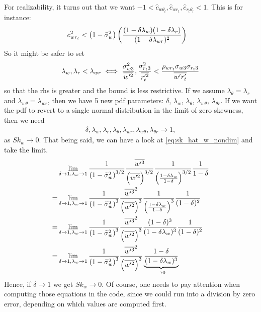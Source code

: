 For realizability, it turns out that we want
$-1 < \widehat{c}_{w \theta_l}, \widehat{c}_{w r_t}, \widehat{c}_{r_t \theta_l} < 1$.
This is for instance:
\begin{align}
    c_{w r_t}^2 &< \left( 1 - \tilde{\sigma}_w^2 \right) \left(
    \frac{(1-\delta \lambda_w)(1-\delta \lambda_r)}{(1-\delta \lambda_{w r})^2}
    \right)
\end{align}
So it might be safer to set
\begin{align}
    \label{eq:lambda_corr_ineq}
    \lambda_w , \lambda_r < \lambda_{w r}
    \iff
    \frac{\sigma_{w 3}^2}{\overline{w'^2}}, \frac{\sigma_{r_t 3}^2}{\overline{r_t'^2}} <
    \frac{\rho_{w r_t} \sigma_{w 3} \sigma_{r_t 3}}{\overline{w' r_t'}}
\end{align}
so that the \gls{rhs} is greater and the bound is less restrictive.
If we assume $\lambda_\theta = \lambda_r$ and $\lambda_{w\theta} = \lambda_{wr}$,
then we have 5 new \gls{pdf} parameters:
$\delta$, $\lambda_w$, $\lambda_\theta$, $\lambda_{w \theta}$, $\lambda_{\theta r}$.
If we want the \gls{pdf} to revert to a single normal distribution in the limit of zero skewness,
then we need
\begin{align}
    \delta, \lambda_w, \lambda_r, \lambda_\theta,
    \lambda_{w r}, \lambda_{w \theta}, \lambda_{\theta r}
    \to 1,
\end{align}
as $Sk_w \to 0$.
That being said, we can have a look at \cref{eq:sk_hat_w_nondim} and take the limit.
\begin{align}
    &\lim_{\delta \to 1, \lambda_w \to 1}
    \frac{1}{\left( 1 - \tilde{\sigma}_w^2 \right)^{3/2}}
    \frac{\overline{w'^3}}{\left(\overline{w'^2} \right)^{3/2}}
    \frac{1}{\left(\frac{1-\delta \lambda_w}{1-\delta}\right)^{3/2}}
    \frac{1}{1-\delta} \nonumber \\
    =&\lim_{\delta \to 1, \lambda_w \to 1}
    \frac{1}{\left( 1 - \tilde{\sigma}_w^2 \right)^3}
    \frac{\overline{w'^3}^2}{\left(\overline{w'^2} \right)^3}
    \frac{1}{\left(\frac{1-\delta \lambda_w}{1-\delta}\right)^3}
    \frac{1}{(1-\delta)^2} \nonumber \\
    =&\lim_{\delta \to 1, \lambda_w \to 1}
    \frac{1}{\left( 1 - \tilde{\sigma}_w^2 \right)^3}
    \frac{\overline{w'^3}^2}{\left(\overline{w'^2} \right)^3}
    \frac{(1-\delta)^3}{(1-\delta \lambda_w)^3}
    \frac{1}{(1-\delta)^2} \nonumber \\
    =&\lim_{\delta \to 1, \lambda_w \to 1}
    \frac{1}{\left( 1 - \tilde{\sigma}_w^2 \right)^3}
    \frac{\overline{w'^3}^2}{\left(\overline{w'^2} \right)^3}
    \underbrace{\frac{1-\delta}{(1-\delta \lambda_w)^3}}_{\to 0}
\end{align}
Hence, if $\delta \to 1$ we get $Sk_w \to 0$.
Of course, one needs to pay attention when computing those equations in the code,
since we could run into a division by zero error,
depending on which values are computed first.